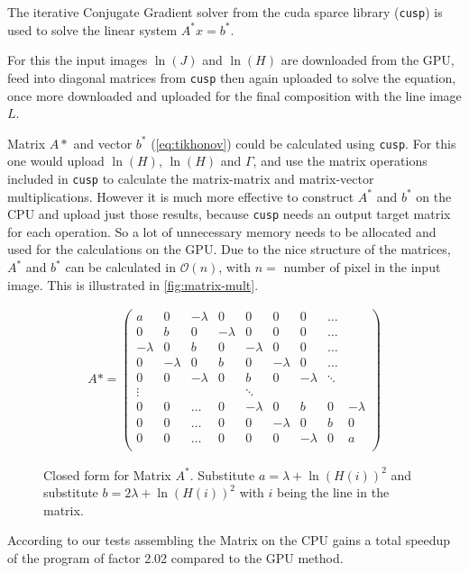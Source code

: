 The iterative Conjugate Gradient solver from the cuda sparce library
(\texttt{cusp}) is used to solve the linear system $A^* x = b^*$.

For this the input images $\ln(J)$ and $\ln(H)$ are downloaded from the GPU,
feed into diagonal matrices from \texttt{cusp} then again uploaded to solve the
equation, once more downloaded and uploaded for the final composition with the
line image $L$.

Matrix $A*$ and vector $b^*$ (\autoref{eq:tikhonov}) could be calculated using
\texttt{cusp}. For this one would upload $\ln(H)$, $\ln(H)$ and $\Gamma$, and
use the matrix operations included in \texttt{cusp} to calculate the
matrix-matrix and matrix-vector multiplications. However it is much more
effective to construct $A^*$ and $b^*$ on the CPU and upload just those results,
because \texttt{cusp} needs an output target matrix for each operation. So a lot
of unnecessary memory needs to be allocated and used for the calculations on the
GPU.  Due to the nice structure of the matrices, $A^*$ and $b^*$  can be
calculated in $\mathcal{O}(n)$, with $n =$ number of pixel in the input image.
This is illustrated in \autoref{fig:matrix-mult}.

\begin{figure}[htb]
  \centering
  {\small
  \begin{align*}
    A*= \begin{pmatrix}
      a & 0 & -\lambda & 0 & 0 & 0 & 0 & \dots\\
      0 & b & 0 & -\lambda & 0 & 0 & 0 & \dots\\
      -\lambda & 0 & b & 0 & -\lambda & 0 & 0 & \dots\\
      0 & -\lambda & 0 & b & 0 & -\lambda & 0 & \dots\\
      0 & 0 & -\lambda & 0 & b & 0 & -\lambda & \ddots\\
      \vdots& &  &  &\ddots  \\
      0 & 0 & \dots & 0 & -\lambda & 0 & b & 0 & -\lambda\\
      0 & 0 & \dots & 0 & 0 &-\lambda & 0 & b & 0\\
      0 & 0 & \dots & 0 & 0 & 0 &-\lambda & 0 & a \\
    \end{pmatrix}
  \end{align*}
}
  \caption{Closed form for Matrix $A^*$. Substitute $a = \lambda +
  \ln(H(i))^2$ and substitute $b = 2\lambda + \ln(H(i))^2$ with $i$ being the line
in the matrix.}
  \label{fig:matrix-mult}
\end{figure}

According to our tests assembling the Matrix on the CPU gains a total speedup
of the program of factor 2.02 compared to the GPU method.
